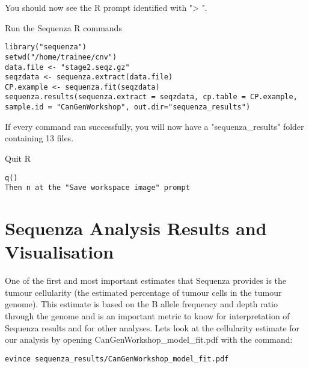 You should now see the R prompt identified with "> ".

\begin{steps}
Run the Sequenza R commands
\begin{lstlisting}
library("sequenza")
setwd("/home/trainee/cnv")
data.file <- "stage2.seqz.gz"
seqzdata <- sequenza.extract(data.file)
CP.example <- sequenza.fit(seqzdata)
sequenza.results(sequenza.extract = seqzdata, cp.table = CP.example, sample.id = "CanGenWorkshop", out.dir="sequenza_results")
\end{lstlisting}
\end{steps}

If every command ran successfully, you will now have a "sequenza\_results" folder containing 13 files.

\begin{steps}
Quit R
\begin{lstlisting}
q()
Then n at the "Save workspace image" prompt
\end{lstlisting}
\end{steps}


\newpage


\section{Sequenza Analysis Results and Visualisation}

One of the first and most important estimates that Sequenza provides is the tumour cellularity (the estimated percentage of tumour cells in the tumour genome). This estimate is based on the B allele frequency and depth ratio through the genome and is an important metric to know for interpretation of Sequenza results and for other analyses. Lets look at the cellularity estimate for our analysis by opening CanGenWorkshop\_model\_fit.pdf with the command:

\begin{steps}
\begin{lstlisting}
evince sequenza_results/CanGenWorkshop_model_fit.pdf
\end{lstlisting}
\end{steps}


